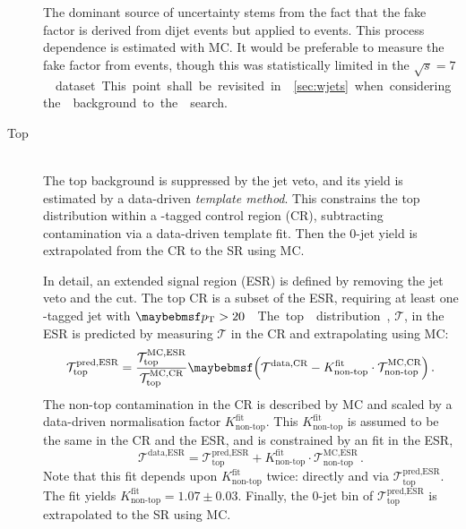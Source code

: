 \begin{description}
	The dominant source of uncertainty stems from the fact that the fake factor is 
	derived from dijet events but applied to \Wjets events. This process dependence is 
	estimated with MC. It would be preferable to measure the fake factor from \Zjets 
	events, though this was statistically limited in the \unit{$\sqrt{s} = 7$}{\TeV} 
	dataset. This point shall be revisited in \Section~\ref{sec:wjets} when considering 
	the \Wjets background to the \HWW search.

\item[Top] \hfill \\
	The top background is suppressed by the jet veto, and its yield is estimated by a 
	data-driven \textit{template method}. This constrains the top \njets distribution within 
	a \Pbottom-tagged control region (CR), subtracting contamination via a data-driven 
	template fit. Then the 0-jet yield is extrapolated from the CR to the SR using MC.

	In detail, an extended signal region (ESR) is defined by removing the jet veto and the 
	\ptll cut. The top CR is a subset of the ESR, requiring at least one \Pbottom-tagged jet 
	with \unit{$\pt > 20$}{\GeV}. The top \njets distribution, $\mathcal{T}$, in the ESR is 
	predicted by measuring $\mathcal{T}$ in the CR and extrapolating using MC:
	\begin{equation}
		\mathcal{T}_{\text{top}}^{\text{pred,ESR}} = \frac{\mathcal{T}_{\text{top}}^{\text{MC,ESR}}}{\mathcal{T}_{\text{top}}^{\text{MC,CR}}} \parenths{\mathcal{T}^{\text{data,CR}} - K_{\text{non-top}}^{\text{fit}} \cdot \mathcal{T}_{\text{non-top}}^{\text{MC,CR}}} \,.
	\end{equation}
	The non-top contamination in the CR is described by MC and scaled by a data-driven 
	normalisation factor $K_{\text{non-top}}^{\text{fit}}$. This 
	$K_{\text{non-top}}^{\text{fit}}$ is assumed to be the same in the CR and the ESR, 
	and is constrained by an \njets fit in the ESR, \ie
	\begin{equation}
		\mathcal{T}^{\text{data,ESR}} = \mathcal{T}_{\text{top}}^{\text{pred,ESR}} + K_{\text{non-top}}^{\text{fit}} \cdot \mathcal{T}_{\text{non-top}}^{\text{MC,ESR}} \,.
	\end{equation}
	Note that this fit depends upon $K_{\text{non-top}}^{\text{fit}}$ twice: directly and 
	via $\mathcal{T}_{\text{top}}^{\text{pred,ESR}}$. The fit yields 
	$K_{\text{non-top}}^{\text{fit}} = 1.07 \pm 0.03$. Finally, the 0-jet bin of 
	$\mathcal{T}_{\text{top}}^{\text{pred,ESR}}$ is extrapolated to the SR using MC.


\end{description}
